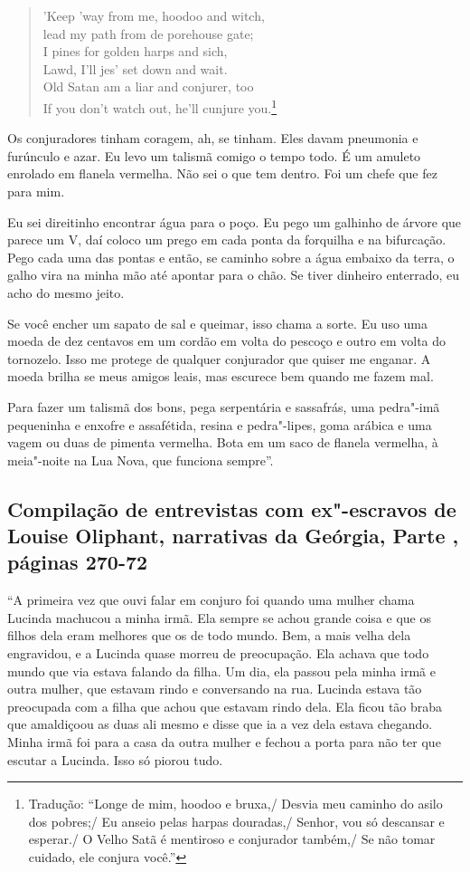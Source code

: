 \begin{verse}
'Keep 'way from me, hoodoo and witch,\\
lead my path from de porehouse gate;\\
I pines for golden harps and sich,\\ 
Lawd, I'll jes' set down and wait.\\
Old Satan am a liar and conjurer, too\\
If you don't watch out, he'll cunjure you.\footnote{Tradução: ``Longe de mim, hoodoo e bruxa,/ Desvia meu caminho do asilo dos pobres;/ Eu anseio pelas harpas douradas,/ Senhor, vou só descansar e esperar./ O Velho Satã é mentiroso e conjurador também,/ Se não tomar cuidado, ele
conjura você.''}
\end{verse}

Os conjuradores tinham coragem, ah, se tinham. Eles davam pneumonia e
furúnculo e azar. Eu levo um talismã comigo o tempo todo. É um amuleto
enrolado em flanela vermelha. Não sei o que tem dentro. Foi um chefe que
fez para mim.

Eu sei direitinho encontrar água para o poço. Eu pego um galhinho de
árvore que parece um V, daí coloco um prego em cada ponta da forquilha e
na bifurcação. Pego cada uma das pontas e então, se caminho sobre a água
embaixo da terra, o galho vira na minha mão até apontar para o chão. Se
tiver dinheiro enterrado, eu acho do mesmo jeito.

Se você encher um sapato de sal e queimar, isso chama a sorte. Eu uso
uma moeda de dez centavos em um cordão em volta do pescoço e outro em
volta do tornozelo. Isso me protege de qualquer conjurador que quiser me
enganar. A moeda brilha se meus amigos leais, mas escurece bem quando me %
fazem mal.

Para fazer um talismã dos bons, pega serpentária e sassafrás, uma
pedra"-imã pequeninha e enxofre e assafétida, resina e pedra"-lipes, goma
arábica e uma vagem ou duas de pimenta vermelha. Bota em um saco de
flanela vermelha, à meia"-noite na Lua Nova, que funciona sempre''.

\subsection{Compilação de entrevistas com ex"-escravos de Louise Oliphant, narrativas
da Geórgia, Parte , páginas 270-72}

``A primeira vez que ouvi falar em conjuro foi quando uma mulher chama
Lucinda machucou a minha irmã. Ela sempre se achou grande coisa e que os
filhos dela eram melhores que os de todo mundo. Bem, a mais velha dela
engravidou, e a Lucinda quase morreu de preocupação. Ela achava que todo
mundo que via estava falando da filha. Um dia, ela passou pela minha
irmã e outra mulher, que estavam rindo e conversando na rua. Lucinda
estava tão preocupada com a filha que achou que estavam rindo dela. Ela
ficou tão braba que amaldiçoou as duas ali mesmo e disse que ia a vez %
dela estava chegando. Minha irmã foi para a casa da outra mulher e
fechou a porta para não ter que escutar a Lucinda. Isso só piorou tudo.

